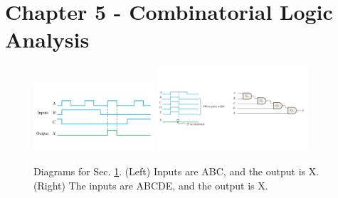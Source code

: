 \documentclass[10pt]{article}
\begin{document}
\clearpage

\section{Chapter 5 - Combinatorial Logic Analysis}
\label{sec:comb}
\begin{figure}[ht]
\centering
\includegraphics[width=0.4\textwidth,trim=0cm 3cm 0cm 2cm,clip=true]{timingExample7.pdf} \hspace{1cm}
\includegraphics[width=0.5\textwidth,trim=0cm 4cm 0cm 2cm,clip=true]{bonus.pdf}
\caption{\label{fig:timing3} Diagrams for Sec. \ref{sec:comb}. (Left) Inputs are ABC, and the output is X. (Right) The inputs are ABCDE, and the output is X.}
\end{figure}
\end{document}
